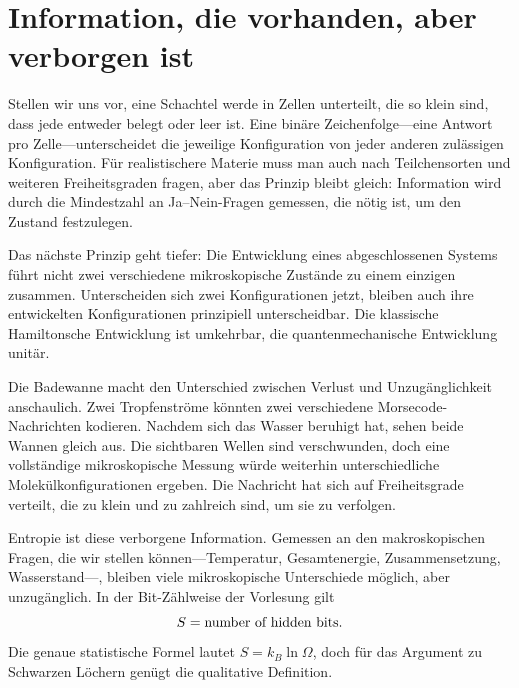 \section{Information, die vorhanden, aber verborgen ist}

Stellen wir uns vor, eine Schachtel werde in Zellen unterteilt, die so klein sind, dass jede entweder belegt oder leer ist. Eine binäre Zeichenfolge---eine Antwort pro Zelle---unterscheidet die jeweilige Konfiguration von jeder anderen zulässigen Konfiguration. Für realistischere Materie muss man auch nach Teilchensorten und weiteren Freiheitsgraden fragen, aber das Prinzip bleibt gleich: Information wird durch die Mindestzahl an Ja--Nein-Fragen gemessen, die nötig ist, um den Zustand festzulegen.

\begin{classroomqa}
\end{classroomqa}

Das nächste Prinzip geht tiefer: Die Entwicklung eines abgeschlossenen Systems führt nicht zwei verschiedene mikroskopische Zustände zu einem einzigen zusammen. Unterscheiden sich zwei Konfigurationen jetzt, bleiben auch ihre entwickelten Konfigurationen prinzipiell unterscheidbar. Die klassische Hamiltonsche Entwicklung ist umkehrbar, die quantenmechanische Entwicklung unitär.

Die Badewanne macht den Unterschied zwischen Verlust und Unzugänglichkeit anschaulich. Zwei Tropfenströme könnten zwei verschiedene Morsecode-Nachrichten kodieren. Nachdem sich das Wasser beruhigt hat, sehen beide Wannen gleich aus. Die sichtbaren Wellen sind verschwunden, doch eine vollständige mikroskopische Messung würde weiterhin unterschiedliche Molekülkonfigurationen ergeben. Die Nachricht hat sich auf Freiheitsgrade verteilt, die zu klein und zu zahlreich sind, um sie zu verfolgen.

Entropie ist diese verborgene Information. Gemessen an den makroskopischen Fragen, die wir stellen können---Temperatur, Gesamtenergie, Zusammensetzung, Wasserstand---, bleiben viele mikroskopische Unterschiede möglich, aber unzugänglich. In der Bit-Zählweise der Vorlesung gilt
\begin{equation}
S=\hbox{number of hidden bits}.
\end{equation}
Die genaue statistische Formel lautet \(S=k_B\ln\Omega\), doch für das Argument zu Schwarzen Löchern genügt die qualitative Definition.

